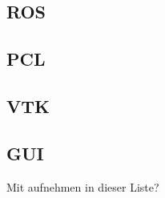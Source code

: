 \subsection{ROS}

\subsection{PCL}

\subsection{VTK}

\subsection{GUI}
Mit aufnehmen in dieser Liste?

